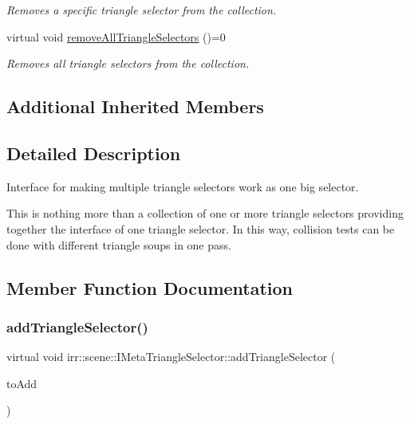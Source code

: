 \begin{DoxyCompactItemize}
\begin{DoxyCompactList}\small\item\em Removes a specific triangle selector from the collection. \end{DoxyCompactList}\item 
\mbox{\label{classirr_1_1scene_1_1IMetaTriangleSelector_a4137793b61aed8cc8e60f8362feba939}} 
virtual void \hyperlink{classirr_1_1scene_1_1IMetaTriangleSelector_a4137793b61aed8cc8e60f8362feba939}{remove\+All\+Triangle\+Selectors} ()=0
\begin{DoxyCompactList}\small\item\em Removes all triangle selectors from the collection. \end{DoxyCompactList}\end{DoxyCompactItemize}
\subsection*{Additional Inherited Members}


\subsection{Detailed Description}
Interface for making multiple triangle selectors work as one big selector. 

This is nothing more than a collection of one or more triangle selectors providing together the interface of one triangle selector. In this way, collision tests can be done with different triangle soups in one pass. 

\subsection{Member Function Documentation}
\mbox{\label{classirr_1_1scene_1_1IMetaTriangleSelector_afb19b5f7cbf37d202b09c126417f9a83}} 
\subsubsection{\texorpdfstring{add\+Triangle\+Selector()}{addTriangleSelector()}\hspace{0.1cm}{\footnotesize\ttfamily [1/2]}}
{\footnotesize\ttfamily virtual void irr\+::scene\+::\+I\+Meta\+Triangle\+Selector\+::add\+Triangle\+Selector (\begin{DoxyParamCaption}\item[{\hyperlink{classirr_1_1scene_1_1ITriangleSelector}{I\+Triangle\+Selector} $\ast$}]{to\+Add }\end{DoxyParamCaption})\hspace{0.3cm}{\ttfamily [pure virtual]}}



